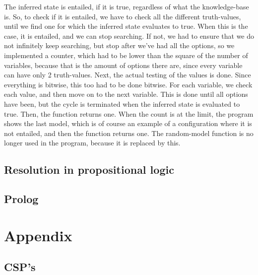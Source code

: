 \documentclass{article}
\begin{document}
	The inferred state is entailed, if it is true, regardless of what the knowledge-base is. So, to check if it is entailed, we have to check all the different truth-values, until we find one for which the inferred state evaluates to true. When this is the case, it is entailed, and we can stop searching. If not, we had to ensure that we do not infinitely keep searching, but stop after we've had all the options, so we implemented a counter, which had to be lower than the square of the number of variables, because that is the amount of options there are, since every variable can have only 2 truth-values. Next, the actual testing of the values is done. Since everything is bitwise, this too had to be done bitwise. For each variable, we check each value, and then move on to the next variable. This is done until all options have been, but the cycle is terminated when the inferred state is evaluated to true. Then, the function returns one. When the count is at the limit, the program shows the last model, which is of course an example of a configuration where it is not entailed, and then the function returns one. The random-model function is no longer used in the program, because it is replaced by this. 
	
	\subsection*{Resolution in propositional logic}
	
	\subsection*{Prolog}
	
	\section{Appendix}
	\subsection*{CSP's}
	
\end{document}
